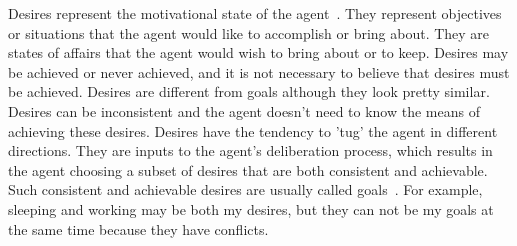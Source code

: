 Desires represent the motivational state of the agent~\cite{Rao_BDITheory_1995}.
They represent objectives or situations that the agent would like to accomplish or bring about.
They are states of affairs that the agent would wish to bring about or to keep.
Desires may be achieved or never achieved, and it is not necessary to believe that desires must be achieved.
Desires are different from goals although they look pretty similar.
Desires can be inconsistent and the agent doesn't need to know the means of achieving these desires.
Desires have the tendency to 'tug' the agent in different directions.
They are inputs to the agent's deliberation process, which results in the agent choosing a subset of desires that are both consistent and achievable.
Such consistent and achievable desires are usually called goals~\cite{Gerhard_MultiSystem_1999}.
For example, sleeping and working may be both my desires, but they can not be my goals at the same time because they have conflicts.

